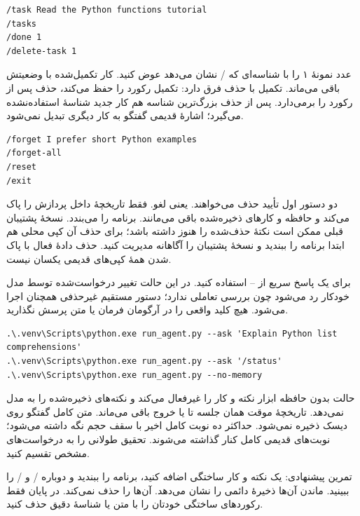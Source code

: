 \begin{LTR}
\begin{Verbatim}[breaklines,breakanywhere,fontsize=\small]
/task Read the Python functions tutorial
/tasks
/done 1
/delete-task 1
\end{Verbatim}
\end{LTR}

عدد نمونهٔ ۱ را با شناسه‌ای که /
 نشان می‌دهد عوض کنید. کار تکمیل‌شده با وضعیتش باقی می‌ماند. تکمیل با حذف فرق دارد: تکمیل رکورد را حفظ می‌کند، حذف پس از 
 رکورد را برمی‌دارد. پس از حذف بزرگ‌ترین شناسه هم کار جدید شناسهٔ استفاده‌نشده می‌گیرد؛ اشارهٔ قدیمی گفتگو به کار دیگری تبدیل نمی‌شود.

\begin{LTR}
\begin{Verbatim}[breaklines,breakanywhere,fontsize=\small]
/forget I prefer short Python examples
/forget-all
/reset
/exit
\end{Verbatim}
\end{LTR}

دو دستور اول تأیید حذف می‌خواهند. 
 یعنی لغو. 
 فقط تاریخچهٔ داخل پردازش را پاک می‌کند و حافظه و کارهای ذخیره‌شده باقی می‌مانند. 
 برنامه را می‌بندد. نسخهٔ پشتیبان قبلی ممکن است نکتهٔ حذف‌شده را هنوز داشته باشد؛ برای حذف آن کپی محلی هم ابتدا برنامه را ببندید و نسخهٔ پشتیبان را آگاهانه مدیریت کنید. حذف دادهٔ فعال با پاک شدن همهٔ کپی‌های قدیمی یکسان نیست.

برای یک پاسخ سریع از --
 استفاده کنید. در این حالت تغییر درخواست‌شده توسط مدل خودکار رد می‌شود چون بررسی تعاملی ندارد؛ دستور مستقیم غیرحذفی همچنان اجرا می‌شود. هیچ کلید واقعی را در آرگومان فرمان یا متن پرسش نگذارید.

\begin{LTR}
\begin{Verbatim}[breaklines,breakanywhere,fontsize=\small]
.\.venv\Scripts\python.exe run_agent.py --ask 'Explain Python list comprehensions'
.\.venv\Scripts\python.exe run_agent.py --ask '/status'
.\.venv\Scripts\python.exe run_agent.py --no-memory
\end{Verbatim}
\end{LTR}

حالت بدون حافظه ابزار نکته و کار را غیرفعال می‌کند و نکته‌های ذخیره‌شده را به مدل نمی‌دهد. تاریخچهٔ موقت همان جلسه تا 
 یا خروج باقی می‌ماند. متن کامل گفتگو روی دیسک ذخیره نمی‌شود. حداکثر ده نوبت کامل اخیر با سقف حجم نگه داشته می‌شود؛ نوبت‌های قدیمی کامل کنار گذاشته می‌شوند. تحقیق طولانی را به درخواست‌های مشخص تقسیم کنید.

تمرین پیشنهادی: یک نکته و کار ساختگی اضافه کنید، برنامه را ببندید و دوباره /
 و /
 را ببینید. ماندن آن‌ها ذخیرهٔ دائمی 
 را نشان می‌دهد. 
 آن‌ها را حذف نمی‌کند. در پایان فقط رکوردهای ساختگی خودتان را با متن یا شناسهٔ دقیق حذف کنید.

